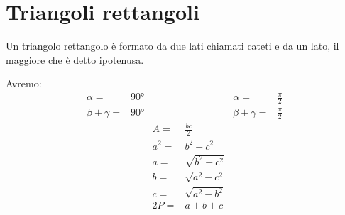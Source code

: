 \section{Triangoli rettangoli}
 Un triangolo rettangolo è formato da due lati chiamati cateti e da un lato, il maggiore che è detto ipotenusa.\par Avremo:\begin{align*}
 \alpha=&{}\ang{90}&&&\alpha=&{}\frac{\pi}{2}\\
 \beta+\gamma=&{}\ang{90}&&&\beta+\gamma=&{}\frac{\pi}{2}\\
 &&A={}&\frac{bc}{2}\\
 &&a^2={}&b^2+c^2\\
  &&a={}&\sqrt{b^2+c^2}\\
  &&b={}&\sqrt{a^2-c^2}\\
  &&c={}&\sqrt{a^2-b^2}\\
  &&2P=&a+b+c
 \end{align*}
